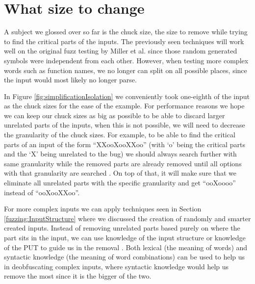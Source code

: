 \section{What size to change}
\label{inputReduction:Chucksize}
A subject we glossed over so far is the chuck size, the size to remove while trying to find the critical parts of the inputs. 
The previously seen techniques will work well on the original fuzz testing by Miller et al. \cite{4originalFuzzingUnixUtils} since those random generated symbols were independent from each other. However, when testing more complex words such as function names, we no longer can split on all possible places, since the input would most likely no longer parse. 

In Figure \ref{fig:simplificationIsolation} we conveniently took one-eighth of the input as the chuck sizes for the ease of the example. For performance reasons we hope we can keep our chuck sizes as big as possible to be able to discard larger unrelated parts of the inputs, when this is not possible, we will need to decrease the granularity of the chuck sizes.
For example, to be able to find the critical parts of an input of the form “XXooXooXXoo” (with ‘o’ being the critical parts and the ‘X’ being unrelated to the bug) we should always search further with same granularity while the removed parts are already removed until all options with that granularity are searched \cite{bookZellerwhyProgramsFail}. On top of that, it will make sure that we eliminate all unrelated parts with the specific granularity and get “ooXoooo” instead of “ooXooXXoo”. 

For more complex inputs we can apply techniques seen in Section \ref{fuzzing:InputStructure} where we discussed the creation of randomly and smarter created inputs. Instead of removing unrelated parts based purely on where the part sits in the input, we can use knowledge of the input structure or knowledge of the PUT to guide us in the removal \cite{bookZellerwhyProgramsFail}. Both lexical (the meaning of words) and syntactic knowledge (the meaning of word combinations) can be used to help us in deobfuscating complex inputs, where syntactic knowledge would help us remove the most since it is the bigger of the two.

